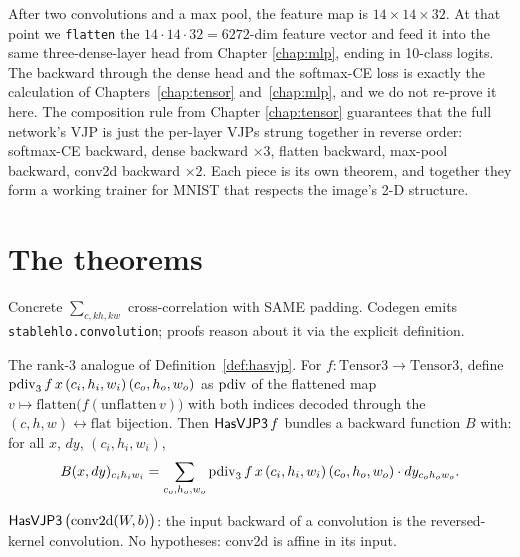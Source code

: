 
After two convolutions and a max pool, the feature map is
\(14 \times 14 \times 32\). At that point we \texttt{flatten} the
\(14 \cdot 14 \cdot 32 = 6272\)-dim feature vector and feed it into
the same three-dense-layer head from Chapter \ref{chap:mlp},
ending in 10-class logits. The backward through the dense head and
the softmax-CE loss is exactly the calculation of
Chapters~\ref{chap:tensor} and~\ref{chap:mlp}, and we do not re-prove it here. The composition rule
from Chapter \ref{chap:tensor} guarantees that the full network's
VJP is just the per-layer VJPs strung together in reverse order:
softmax-CE backward, dense backward $\times 3$, flatten backward,
max-pool backward, conv2d backward $\times 2$. Each piece is its
own theorem, and together they form a working trainer for MNIST that
respects the image's 2-D structure.

\section{The theorems}



\begin{definition}
  \label{ax:conv2d}
  \leanok
  Concrete \(\sum_{c,kh,kw}\) cross-correlation with SAME padding.
  Codegen emits \texttt{stablehlo.convolution}; proofs reason about it
  via the explicit definition.
\end{definition}

\begin{definition}
  \label{def:hasvjp3}
  \leanok
  The rank-3 analogue of Definition~\ref{def:hasvjp}. For
  \(f : \mathrm{Tensor3} \to \mathrm{Tensor3}\), define
  \(\operatorname{pdiv}_3 f\, x\, (c_i, h_i, w_i)\, (c_o, h_o, w_o)\) as \(\operatorname{pdiv}\)
  of the flattened map
  \(v \mapsto \mathrm{flatten}\bigl(f(\mathrm{unflatten}\, v)\bigr)\)
  with both indices decoded through the
  \((c, h, w) \leftrightarrow \text{flat}\) bijection. Then
  \(\mathsf{HasVJP3}\, f\) bundles a backward function \(B\) with: for all
  \(x\), \(dy\), \((c_i, h_i, w_i)\),
  \[
    B(x, dy)_{c_i h_i w_i}
      = \sum_{c_o, h_o, w_o}
        \operatorname{pdiv}_3 f\, x\, (c_i, h_i, w_i)\, (c_o, h_o, w_o)
        \cdot dy_{c_o h_o w_o}.
  \]
\end{definition}

\begin{theorem}
  \label{ax:conv2dHasVJP3}
  \leanok
  \(\mathsf{HasVJP3}\, \bigl(\mathrm{conv2d}(W, b)\bigr)\): the input
  backward of a convolution is the reversed-kernel convolution.
  No hypotheses: conv2d is affine in its input.
\end{theorem}

